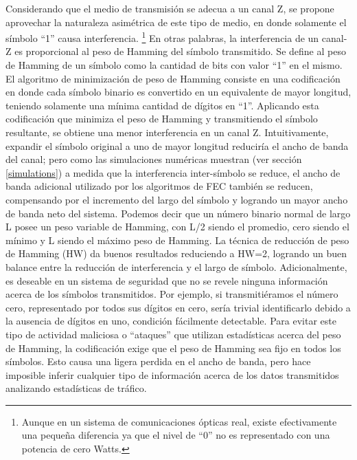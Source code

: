Considerando que el medio de transmisión se adecua a un canal Z, se propone aprovechar la naturaleza asimétrica de este tipo de medio, en donde solamente el símbolo ``1'' causa interferencia. \footnote{Aunque en un sistema de comunicaciones ópticas real, existe efectivamente una pequeña diferencia ya que el nivel de ``0'' no es representado con una potencia de cero Watts.}
En otras palabras, la interferencia de un canal-Z es proporcional al peso de Hamming del símbolo transmitido.
Se define al peso de Hamming de un símbolo como la cantidad de bits con valor ``1'' en el mismo. El algoritmo de minimización de peso de Hamming consiste en una codificación en donde cada símbolo binario es convertido en un equivalente de mayor longitud, teniendo solamente una mínima cantidad de dígitos en ``1''. Aplicando esta codificación que minimiza el peso de Hamming y transmitiendo el símbolo resultante, se obtiene una menor interferencia en un canal Z.
Intuitivamente, expandir el símbolo original a uno de mayor longitud reduciría el ancho de banda del canal; pero como las simulaciones numéricas muestran (ver sección \ref{simulations}) a medida que la interferencia inter-símbolo se reduce, el ancho de banda adicional utilizado por los algoritmos de FEC también se reducen, compensando por el incremento del largo del símbolo y logrando un mayor ancho de banda neto del sistema.
Podemos decir que un número binario normal de largo L posee un peso variable de Hamming, con L/2 siendo el promedio, cero siendo el mínimo y L siendo el máximo peso de Hamming.
La técnica de reducción de peso de Hamming (HW) da buenos resultados reduciendo a HW=2, logrando un buen balance entre la reducción de interferencia y el largo de símbolo.
Adicionalmente, es deseable en un sistema de seguridad que no se revele ninguna información acerca de los símbolos transmitidos. Por ejemplo, si transmitiéramos el número cero, representado por todos sus dígitos en cero, sería trivial identificarlo debido a la ausencia de dígitos en uno, condición fácilmente detectable. Para evitar este tipo de actividad maliciosa o ``ataques'' que utilizan estadísticas acerca del peso de Hamming, la codificación exige que el peso de Hamming sea fijo en todos los símbolos. Esto causa una ligera perdida en el ancho de banda, pero hace imposible inferir cualquier tipo de información acerca de los datos transmitidos analizando estadísticas de tráfico.

